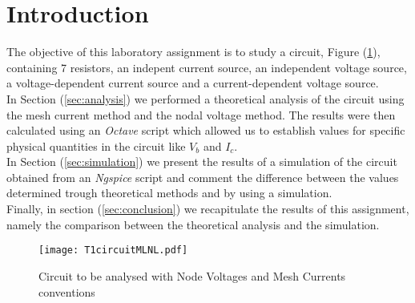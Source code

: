 \clearpage

\section{Introduction}
\label{sec:introduction}

The objective of this laboratory assignment is to study a circuit, Figure (\ref{fig:1}),
containing 7 resistors, an indepent current source, an independent voltage source, a voltage-dependent
current source and a current-dependent voltage source.
\\
In Section (\ref{sec:analysis}) we performed a theoretical analysis of the circuit using the mesh current method
and the nodal voltage method. The results were then calculated using an \emph{Octave} script which allowed us
to establish values for specific physical quantities in the circuit like $V_b$ and $I_c$.
\\
In Section (\ref{sec:simulation}) we present the results of a simulation of the circuit obtained from an
\emph{Ngspice} script and comment the difference between the values determined trough theoretical methods and
by using a simulation.
\\
Finally, in section (\ref{sec:conclusion}) we recapitulate the results of this assignment, namely the comparison between
the theoretical analysis and the simulation.

\begin{figure}[H] \centering
    \texttt{[image: T1circuitMLNL.pdf]}
    \caption{Circuit to be analysed with Node Voltages and Mesh Currents conventions}
    \label{fig:1}
\end{figure}

